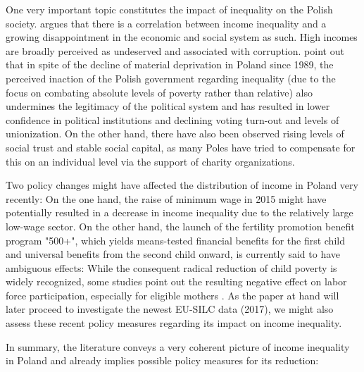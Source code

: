 \documentclass[a4paper]{article}\usepackage[]{graphicx}\usepackage[]{color}
\begin{document}
One very important topic constitutes the impact of inequality on the Polish society. \cite{brzezinski2017} argues that there is a correlation between income inequality and a growing disappointment in the economic and social system as such. High incomes are broadly perceived as undeserved and associated with corruption. \cite{letki2014rise} point out that in spite of the decline of material deprivation in Poland since 1989, the perceived inaction of the Polish government regarding inequality (due to the focus on combating absolute levels of poverty rather than relative) also undermines the legitimacy of the political system and has resulted in lower confidence in political institutions and declining voting turn-out and levels of unionization. On the other hand, there have also been observed rising levels of social trust and stable social capital, as many Poles have tried to compensate for this on an individual level via the support of charity organizations. 

Two policy changes might have affected the distribution of income in Poland very recently: On the one hand, the raise of minimum wage in 2015 might have potentially resulted in a decrease in income inequality due to the relatively large low-wage sector. On the other hand, the launch of the fertility promotion benefit program "500+", which yields means-tested financial benefits for the first child and universal benefits from the second child onward, is currently said to have ambiguous effects: While the consequent radical reduction of child poverty is widely recognized, some studies point out the resulting negative effect on labor force participation, especially for eligible mothers \parencite{bargu2018, magda2018}. As the paper at hand will later proceed to investigate the newest EU-SILC data (2017), we might also assess these recent policy measures regarding its impact on income inequality.

In summary, the literature conveys a very coherent picture of income inequality in Poland and already implies possible policy measures for its reduction:
\end{document}
